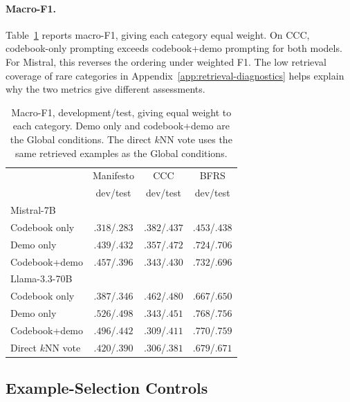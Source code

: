 \documentclass[11pt]{article}
\begin{document}
\paragraph{Macro-F1.}
Table~\ref{tab:macro-new} reports macro-F1, giving each category equal weight. On CCC, codebook-only prompting exceeds codebook+demo prompting for both models. For Mistral, this reverses the ordering under weighted F1. The low retrieval coverage of rare categories in Appendix~\ref{app:retrieval-diagnostics} helps explain why the two metrics give different assessments.

\begin{table}[!t]
\centering
\begin{tabular}{lccc}
\toprule
 & Manifesto & CCC & BFRS \\
 & dev/test & dev/test & dev/test \\
\midrule
\multicolumn{4}{l}{Mistral-7B} \\
Codebook only & $.318$/$.283$ & $.382$/$.437$ & $.453$/$.438$ \\
Demo only & $.439$/$.432$ & $.357$/$.472$ & $.724$/$.706$ \\
Codebook+demo & $.457$/$.396$ & $.343$/$.430$ & $.732$/$.696$ \\
\midrule
\multicolumn{4}{l}{Llama-3.3-70B} \\
Codebook only & $.387$/$.346$ & $.462$/$.480$ & $.667$/$.650$ \\
Demo only & $.526$/$.498$ & $.343$/$.451$ & $.768$/$.756$ \\
Codebook+demo & $.496$/$.442$ & $.309$/$.411$ & $.770$/$.759$ \\
\midrule
Direct $k$NN vote & $.420$/$.390$ & $.306$/$.381$ & $.679$/$.671$ \\
\bottomrule
\end{tabular}
\caption{Macro-F1, development/test, giving equal weight to each category. Demo only and codebook+demo are the Global conditions. The direct $k$NN vote uses the same retrieved examples as the Global conditions.}
\label{tab:macro-new}
\end{table}

\subsection{Example-Selection Controls}
\label{app:additional-controls}
\end{document}
